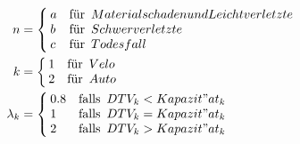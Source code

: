 \begin{align*}
      n &=
      \begin{cases}
        \begin{aligned}
          & a  \\
          & b \\
          & c
        \end{aligned} &
        \begin{aligned}
         & \text{für}\ \thinspace \\
         & \text{für}\ \thinspace \\
         & \text{für}\ \thinspace
        \end{aligned}
        \begin{aligned}
          & {Materialschaden und Leichtverletzte} \\
          & {Schwerverletzte} \\
          & {Todesfall}
        \end{aligned}
      \end{cases}  \\
      
      k &=
      \begin{cases}
        \begin{aligned}
          & 1 \\
          & 2
        \end{aligned} &
        \begin{aligned}
         & \text{für}\ \thinspace \\
         & \text{für}\ \thinspace
        \end{aligned}
        \begin{aligned}
          & Velo \\
          & Auto
        \end{aligned}
      \end{cases} \\
      
      \lambda_{k} &=
      \begin{cases}
        \begin{aligned}
          & 0.8  \\
          & 1 \\
          & 2
        \end{aligned} &
        \begin{aligned}
         & \text{falls}\ \thinspace \\
         & \text{falls}\ \thinspace \\
         & \text{falls}\ \thinspace
        \end{aligned}
        \begin{aligned}
          & DTV_{k} < Kapazit"at_{k} \\
          & DTV_{k} = Kapazit"at_{k} \\
          & DTV_{k} > Kapazit"at_{k}
        \end{aligned}
      \end{cases}
\end{align*}
 
